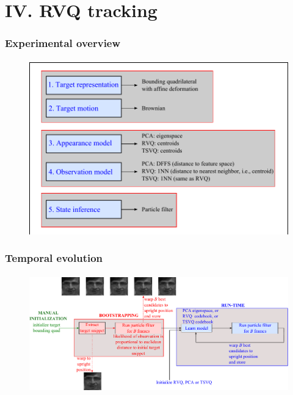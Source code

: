 \section{IV. RVQ tracking}
\begin{frame}
\frametitle{Experimental overview}
\framesubtitle{}
\mypagenum
\setcounter{subfigure}{0}
\begin{figure}[t]
\centering
\includegraphics[width=1.0\textwidth]{thesis/PhD_experimentalOverview.pdf}
\label{fig:overview}
\end{figure}
\end{frame}



\begin{frame}[plain]
\frametitle{Temporal evolution}
\framesubtitle{}
\mypagenum
\setcounter{subfigure}{0}
\begin{changemargin}{-1.3in}{0in}
\begin{figure}[t]
\centering
\includegraphics[width=1.3\textwidth]{thesis/PhD_experimentalTemporalOverview.pdf}
\label{fig:temporal_overview}
\end{figure}
\end{changemargin}
\end{frame}


